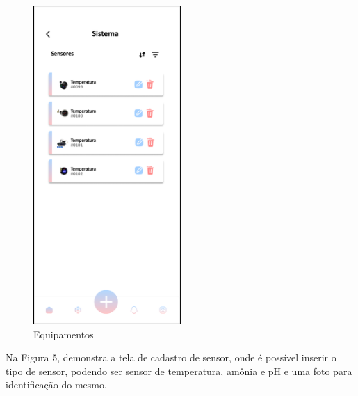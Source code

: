\begin{figure}[!htb]
    \centering
    \caption{Equipamentos}%
    \label{fig:sistema}
    \includegraphics[width = 0.5\textwidth]{Imagem/Sistema.png}
\end{figure}

\newpage

Na Figura 5, demonstra a tela de cadastro de sensor, onde é possível inserir o tipo de sensor, podendo ser sensor de temperatura, amônia e pH e uma foto para identificação do mesmo.

